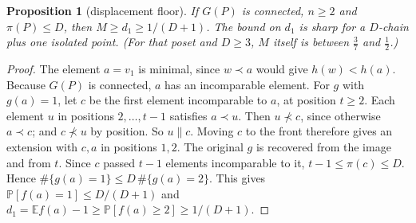 \documentclass[10pt]{amsart}
\newtheorem{proposition}[theorem]{Proposition}
\theoremstyle{definition}
\theoremstyle{remark}
\newcommand{\PP}{\mathbb{P}}
\newcommand{\EE}{\mathbb{E}}
\newcommand{\inc}{\parallel}
\begin{document}
\begin{proposition}[displacement floor]\label{prop:B}
If $G(P)$ is connected, $n\ge2$ and $\pi(P)\le D$, then $M\ge d_1\ge 1/(D+1)$. The bound on $d_1$ is sharp for a $D$-chain plus one isolated point. (For that poset and $D\ge3$, $M$ itself is between $\frac37$ and $\frac12$.)
\end{proposition}
\begin{proof}
The element $a=v_1$ is minimal, since $w\prec a$ would give $h(w)<h(a)$.
Because $G(P)$ is connected, $a$ has an incomparable element.
For $g$ with $g(a)=1$, let $c$ be the first element incomparable to $a$, at position $t\ge2$.
Each element $u$ in positions $2,\dots,t-1$ satisfies $a\prec u$. Then $u\not\prec c$, since otherwise $a\prec c$; and $c\not\prec u$ by position. So $u\inc c$.
Moving $c$ to the front therefore gives an extension with $c,a$ in positions $1,2$.
The original $g$ is recovered from the image and from $t$. Since $c$ passed $t-1$ elements incomparable to it, $t-1\le\pi(c)\le D$.
Hence $\#\{g(a)=1\}\le D\,\#\{g(a)=2\}$. This gives $\PP[f(a)=1]\le D/(D+1)$ and $d_1=\EE f(a)-1\ge\PP[f(a)\ge2]\ge1/(D+1)$.
\end{proof}
\end{document}
